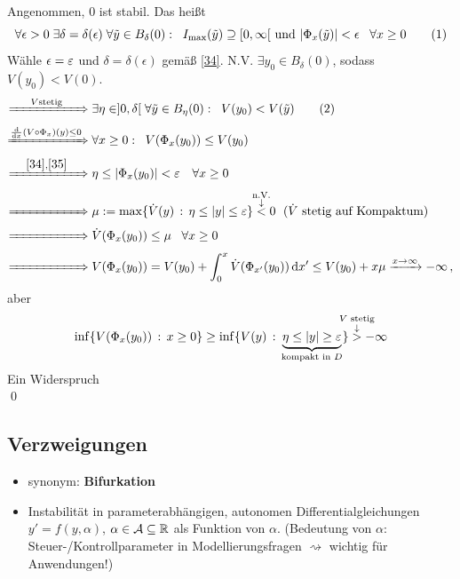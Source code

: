 \documentclass[a4paper]{article}
\begin{document}
\begin{Beweis}
Angenommen, 0 ist stabil. Das heißt
\[\forall \epsilon>0\;\exists \delta=\delta(\epsilon)\;\forall \tilde{y}\in B_{\delta}(0):\;\;I_{\max}(\tilde{y})\supseteq[0,\infty[\text{ und }|\Phi_x(\tilde{y})|<\epsilon\;\;\;\forall x\ge 0\tag{$1$}\label{34}\]
Wähle $\epsilon=\operatorname{\varepsilon}$ und $\delta=\delta(\epsilon)$ gemäß \eqref{34}. N.V. $\exists y_0\in B_{\delta}(0)$, sodass $V(y_0)<V(0)$.
\begin{align*}
\xRightarrow[\hspace{2cm}]{\substack{V\text{stetig}}}
&\; \exists\eta\in]0,\delta[\;\forall \tilde{y}\in B_{\eta}(0):\;\;V(y_0)<V(\tilde{y})\tag{$2$}\label{35}\\
\xRightarrow[\hspace{2cm}]{\substack{\frac{\dd }{\dd x}(V\circ \Phi_x)(y)\le 0}}
&\;\forall x\ge 0:\;\;V(\Phi_x(y_0))\le V(y_0)\\
\xRightarrow[\hspace{2cm}]{\eqref{34},\eqref{35}}
&\;\eta\le |\Phi_x(y_0)|<\ve\;\;\;\forall x\ge0\\
\xRightarrow[\hspace{2cm}]{}
&\; \mu:=\max\{\dot{V}(y)\,:\,\eta\le |y|\le\ve\}\overset{\ms{\text{n.V.}\\\downarrow}}{<}0\;\te{($\dot{V}$ stetig auf Kompaktum)}\\
\xRightarrow[\hspace{2cm}]{}
&\; \dot{V}(\Phi_x(y_0))\le \mu\;\;\;\forall x\ge0\\
\xRightarrow[\hspace{2cm}]{}
&\; V(\Phi_x(y_0))=V(y_0)+\int_0^x\dot{V}(\Phi_{x'}(y_0))\dd x'\le V(y_0)+x\mu\xrightarrow{x\to\infty}-\infty\,,
\end{align*}
aber
\[\inf\{V(\Phi_x(y_0))\,:\,x\ge0\}\ge\inf\{V(y)\,:\,\underbrace{\eta\le|y|\ge\ve}_{\text{kompakt in }D}\}\overset{\ms{V\text{ stetig}\\\downarrow}}{>}-\infty\]
Ein Widerspruch \lightning\\\qed
\end{Beweis}


\subsection{Verzweigungen}
\begin{itemize}
\item synonym: \textbf{Bifurkation}
\item Instabilität in parameterabhängigen, autonomen Differentialgleichungen $y'=f(y,\alpha)$, $\alpha\in\operatorname{\mathcal{A}}\subseteq\mathbb R$ als Funktion von $\alpha$. (Bedeutung von $\alpha$: Steuer-/Kontrollparameter in Modellierungsfragen $\rightsquigarrow$ wichtig für Anwendungen!)
\end{itemize}
\end{document}
